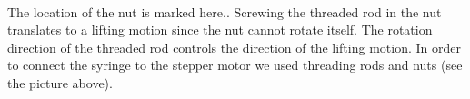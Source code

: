 \documentclass{tufte-handout}
\begin{document}
{
\\The location of the nut is marked here.}.
Screwing the threaded rod in
the nut translates to a lifting motion since the nut cannot rotate itself. The
rotation direction of the threaded rod controls the direction of the lifting
motion. In order to connect the syringe to the stepper motor we used threading
rods and nuts (see the picture above).
\end{document}

